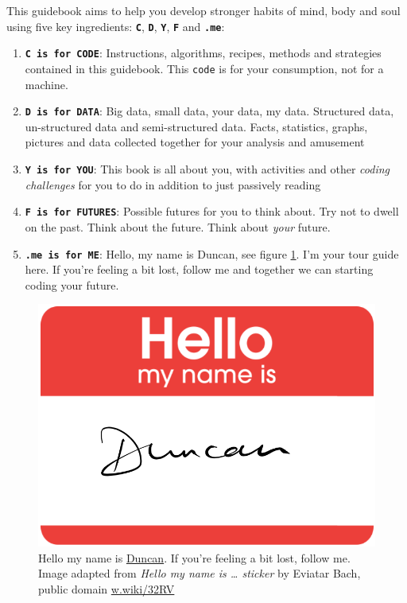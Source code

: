 \documentclass[
]{book}
\providecommand{\tightlist}{%
  \setlength{\itemsep}{0pt}\setlength{\parskip}{0pt}}
\begin{document}
This guidebook aims to help you develop stronger habits of mind, body and soul using five key ingredients: \textbf{\texttt{C}}, \textbf{\texttt{D}}, \textbf{\texttt{Y}}, \textbf{\texttt{F}} and \textbf{\texttt{.me}}:

\begin{enumerate}
\def\labelenumi{\arabic{enumi}.}
\tightlist
\item
  \textbf{\texttt{C\ is\ for\ CODE}}: Instructions, algorithms, recipes, methods and strategies contained in this guidebook. This \texttt{code} is for your consumption, not for a machine.
\item
  \textbf{\texttt{D\ is\ for\ DATA}}: Big data, small data, your data, my data. Structured data, un-structured data and semi-structured data. Facts, statistics, graphs, pictures and data collected together for your analysis and amusement
\item
  \textbf{\texttt{Y\ is\ for\ YOU}}: This book is all about you, with activities and other \emph{coding challenges} for you to do in addition to just passively reading
\item
  \textbf{\texttt{F\ is\ for\ FUTURES}}: Possible futures for you to think about. Try not to dwell on the past. Think about the future. Think about \emph{your} future. \citep{thinkaboutthefuture, wroteforluck}
\item
  \textbf{\texttt{.me\ is\ for\ ME}}: Hello, my name is Duncan, see figure \ref{fig:hello-my-name-fig}. I'm your tour guide here. If you're feeling a bit lost, follow me and together we can starting coding your future.
\end{enumerate}

\begin{figure}

{\centering \includegraphics[width=0.89\linewidth]{images/Hello-my-name-is-Duncan} 

}

\caption{Hello my name is \href{https://en.wikipedia.org/wiki/Duncan_(given_name)}{Duncan}. If you're feeling a bit lost, follow me. Image adapted from \emph{Hello my name is \ldots{} sticker} by Eviatar Bach, public domain \href{https://w.wiki/32RV}{w.wiki/32RV}}\label{fig:hello-my-name-fig}
\end{figure}
\end{document}
